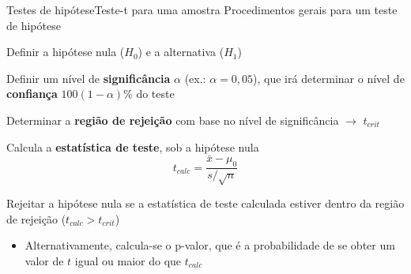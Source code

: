 \documentclass[10pt]{beamer}\usepackage[]{graphicx}\usepackage[]{color}
\makeatletter
\newcommand{\hlstr}[1]{\textcolor[rgb]{0.192,0.494,0.8}{#1}}%
\newcommand{\hlopt}[1]{\textcolor[rgb]{0,0,0}{#1}}%
\newcommand{\hlstd}[1]{\textcolor[rgb]{0.345,0.345,0.345}{#1}}%
\newcommand{\hlkwc}[1]{\textcolor[rgb]{0.333,0.667,0.333}{#1}}%
\newcommand{\hlkwd}[1]{\textcolor[rgb]{0.737,0.353,0.396}{\textbf{#1}}}%
\newenvironment{kframe}{%
 \def\at@end@of@kframe{}%
 \ifinner\ifhmode%
  \def\at@end@of@kframe{\end{minipage}}%
  \begin{minipage}{\columnwidth}%
 \fi\fi%
 \def\FrameCommand##1{\hskip\@totalleftmargin \hskip-\fboxsep
 \colorbox{shadecolor}{##1}\hskip-\fboxsep
     \hskip-\linewidth \hskip-\@totalleftmargin \hskip\columnwidth}%
 \MakeFramed {\advance\hsize-\width
   \@totalleftmargin\z@ \linewidth\hsize
   \@setminipage}}%
 {\par\unskip\endMakeFramed%
 \at@end@of@kframe}
\newenvironment{knitrout}{}{} %
\theoremstyle{definition}
\makeatother
\begin{document}

\begin{frame}[fragile=singleslide]{Testes de hipótese}{Teste-t
    para uma amostra}
Procedimentos gerais para um teste de hipótese
\begin{compactenum}[(1)]
\item Definir a hipótese nula ($H_0$) e a alternativa ($H_1$)
\item Definir um nível de \textbf{significância} $\alpha$ (ex.: $\alpha
  = 0,05$), que irá determinar o nível de \textbf{confiança}
  $100(1-\alpha)\%$ do teste
\item Determinar a \textbf{região de rejeição} com base no nível de
  significância $\rightarrow$ $t_{crit}$
\item Calcula a \textbf{estatística de teste}, sob a hipótese nula
  \begin{equation*}
    t_{calc} = \frac{\bar{x} - \mu_0}{s/\sqrt{n}}
  \end{equation*}
\item Rejeitar a hipótese nula se a estatística de teste calculada
  estiver dentro da região de rejeição ($t_{calc} > t_{crit}$)
  \begin{itemize}
  \item Alternativamente, calcula-se o p-valor, que é a probabilidade de
    se obter um valor de $t$ igual ou maior do que $t_{calc}$
  \end{itemize}
\end{compactenum}
\end{frame}
\end{document}
